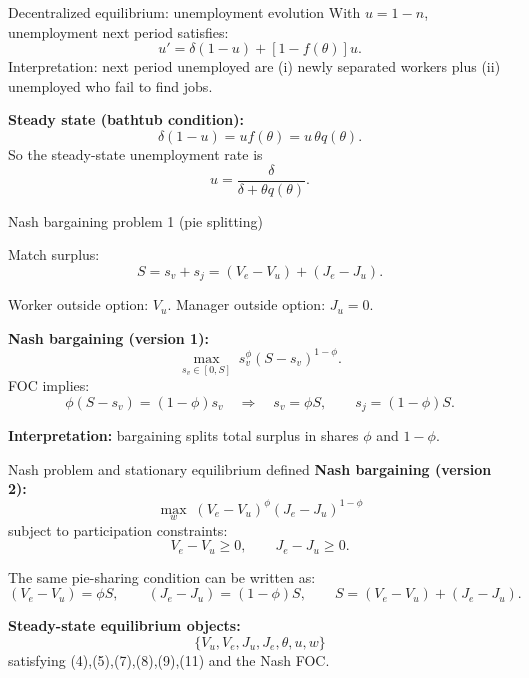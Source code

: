 \documentclass[aspectratio=169,xcolor=dvipsnames]{beamer}
\let\tempone\itemize
\let\temptwo\enditemize
\renewenvironment{itemize}{\tempone\addtolength{\itemsep}{\fill}}{\temptwo}
\begin{document}
\begin{frame}{Decentralized equilibrium: unemployment evolution}
\label{slide:MP_34_Bathtub}
\small
With \(u=1-n\), unemployment next period satisfies:
\[
u' = \delta(1-u) + [1-f(\theta)]u.
\tag{10}
\]
Interpretation: next period unemployed are (i) newly separated workers plus (ii) unemployed who fail to find jobs.

\vspace{0.5em}
\textbf{Steady state (bathtub condition):}
\[
\delta(1-u)=u f(\theta)=u\,\theta q(\theta).
\]
So the steady-state unemployment rate is
\[
u=\frac{\delta}{\delta+\theta q(\theta)}.
\tag{11}
\]
\end{frame}

\begin{frame}{Nash bargaining problem 1 (pie splitting)}
\label{slide:MP_35_Nash1}
\small
\begin{itemize}
    \item Match surplus:
    \[
        S = s_v + s_j = (V_e-V_u) + (J_e-J_u).
    \]
    \item Worker outside option: \(V_u\). Manager outside option: \(J_u=0\).
\end{itemize}

\vspace{0.4em}
\textbf{Nash bargaining (version 1):}
\[
\max_{s_v\in[0,S]} \; s_v^{\phi}(S-s_v)^{1-\phi}.
\]
FOC implies:
\[
\phi(S-s_v)=(1-\phi)s_v
\quad\Rightarrow\quad
s_v=\phi S,\qquad s_j=(1-\phi)S.
\]

\medskip
\textbf{Interpretation:} bargaining splits total surplus in shares \(\phi\) and \(1-\phi\).
\end{frame}

\begin{frame}{Nash problem and stationary equilibrium defined}
\label{slide:MP_36_Nash2_DefEqm}
\small
\textbf{Nash bargaining (version 2):}
\[
\max_{w}\; (V_e-V_u)^{\phi}(J_e-J_u)^{1-\phi}
\tag{12}
\]
subject to participation constraints:
\[
V_e-V_u\ge 0,\qquad J_e-J_u\ge 0.
\tag{13}
\]

The same pie-sharing condition can be written as:
\[
(V_e-V_u)=\phi S,\qquad (J_e-J_u)=(1-\phi)S,\qquad S=(V_e-V_u)+(J_e-J_u).
\]

\vspace{0.4em}
\textbf{Steady-state equilibrium objects:}
\[
\{V_u,V_e,J_u,J_e,\theta,u,w\}
\]
satisfying (4),(5),(7),(8),(9),(11) and the Nash FOC.
\end{frame}
\end{document}
